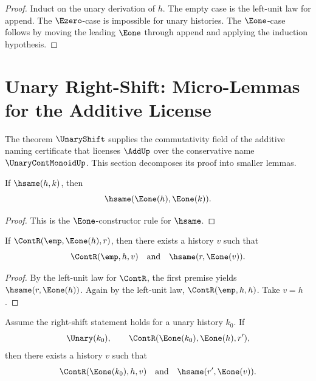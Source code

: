 \begin{proof}
Induct on the unary derivation of \(h\). The empty case is the left-unit law for append. The \(\Ezero\)-case is impossible for unary histories. The \(\Eone\)-case follows by moving the leading \(\Eone\) through append and applying the induction hypothesis.
\end{proof}

\section{Unary Right-Shift: Micro-Lemmas for the Additive License}
\label{sec:po-unary-shift-micro-lemmas}

The theorem \(\UnaryShift\) supplies the commutativity field of the additive naming certificate that licenses \(\AddUp\) over the conservative name \(\UnaryContMonoidUp\). This section decomposes its proof into smaller lemmas.

\begin{lemma}
\label{lem:eone-cong}
If \(\hsame(h,k)\), then
$$
  \hsame(\Eone(h),\Eone(k)).
$$
\end{lemma}

\begin{proof}
This is the \(\Eone\)-constructor rule for \(\hsame\).
\end{proof}

\begin{lemma}
\label{lem:unary-shift-base}
If \(\ContR(\emp,\Eone(h),r)\), then there exists a history \(v\) such that
$$
  \ContR(\emp,h,v)
  \quad\text{and}\quad
  \hsame(r,\Eone(v)).
$$
\end{lemma}

\begin{proof}
By the left-unit law for \(\ContR\), the first premise yields \(\hsame(r,\Eone(h))\). Again by the left-unit law, \(\ContR(\emp,h,h)\). Take \(v=h\).
\end{proof}

\begin{lemma}
\label{lem:unary-shift-step}
Assume the right-shift statement holds for a unary history \(k_0\). If
$$
  \Unary(k_0),
  \qquad
  \ContR(\Eone(k_0),\Eone(h),r'),
$$
then there exists a history \(v\) such that
$$
  \ContR(\Eone(k_0),h,v)
  \quad\text{and}\quad
  \hsame(r',\Eone(v)).
$$
\end{lemma}

